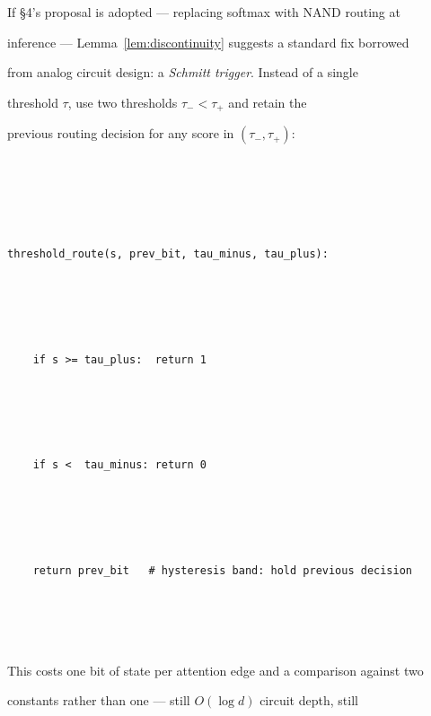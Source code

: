 If \S4's proposal is adopted --- replacing softmax with NAND routing at





inference --- Lemma~\ref{lem:discontinuity} suggests a standard fix borrowed





from analog circuit design: a \emph{Schmitt trigger}. Instead of a single





threshold $\tau$, use two thresholds $\tau_- < \tau_+$ and retain the





previous routing decision for any score in $(\tau_-, \tau_+)$:











\begin{lstlisting}





threshold_route(s, prev_bit, tau_minus, tau_plus):





    if s >= tau_plus:  return 1





    if s <  tau_minus: return 0





    return prev_bit   # hysteresis band: hold previous decision





\end{lstlisting}











This costs one bit of state per attention edge and a comparison against two





constants rather than one --- still $O(\log d)$ circuit depth, still





